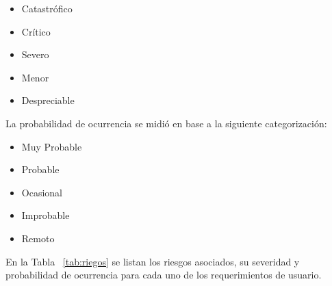 		\begin{itemize}
		  \item Catastrófico
		  \item Crítico	
		  \item Severo	
		  \item Menor	
		  \item Despreciable 
		\end{itemize}
	
		La probabilidad de ocurrencia se midió en base a la siguiente categorización:
	
		\begin{itemize}
		  \item Muy Probable
		  \item Probable	
		  \item Ocasional
		  \item Improbable 	
		  \item Remoto
		\end{itemize}
		
		En la Tabla ~\ref {tab:riegos} se listan los riesgos asociados, su severidad y probabilidad de ocurrencia para cada uno de los
		requerimientos de usuario.
		
		\newpage
		
